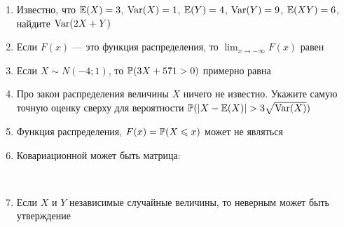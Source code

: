 \documentclass[12pt, a4paper]{article}\usepackage[]{graphicx}\usepackage[]{color}
\begin{document}
\begin{enumerate}
\item Известно, что $\E(X)=3$, $\Var(X)=1$, $\E(Y)=4$, $\Var(Y)=9$, $\E(XY)=6$, найдите $\Var(2X+Y)$


\item Если $F(x)$ — это функция распределения, то $\lim_{x\to -\infty}F(x)$ равен


\item Если $X\sim N(-4;1)$, то $\P(3X+571>0)$ примерно равна


\item Про закон распределения величины $X$ ничего не известно. Укажите самую точную оценку сверху для вероятности $\P(|X-\E(X)|>3\sqrt{\Var(X)})$


\item Функция распределения, $F(x)=\P(X\leq x)$ может не являться


\item Ковариационной может быть матрица:

\\

\item Если $X$ и $Y$ независимые случайные величины, то неверным может быть утверждение


\end{enumerate}
\end{document}
